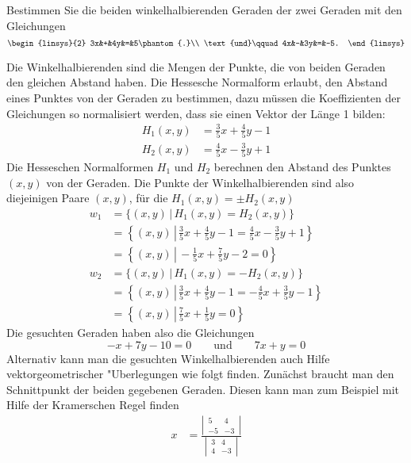 Bestimmen Sie die beiden winkelhalbierenden Geraden der zwei Geraden
mit den Gleichungen
\[
\begin{linsys}{2}
3x&+&4y&=&5\phantom{.}\\
\text{und}\qquad 4x&-&3y&=&-5.
\end{linsys}
\]


\begin{loesung}
Die Winkelhalbierenden sind die Mengen der Punkte, die von beiden
Geraden den gleichen Abstand haben. Die Hessesche Normalform erlaubt,
den Abstand eines Punktes von der Geraden zu bestimmen, dazu müssen
die Koeffizienten der Gleichungen so normalisiert werden, dass sie
einen Vektor der Länge 1 bilden:
\begin{align*}
H_1(x,y)&=\frac35x+\frac45y-1\\
H_2(x,y)&=\frac45x-\frac35y+1
\end{align*}
Die Hesseschen Normalformen $H_1$ und $H_2$ berechnen den Abstand
des Punktes $(x,y)$ von der Geraden. Die Punkte der Winkelhalbierenden
sind also diejeinigen Paare $(x,y)$, für die $H_1(x,y)=\pm H_2(x,y)$
\begin{align*}
w_1
&=
\{(x,y)\,|\, H_1(x,y)=H_2(x,y)\}
\\
&=
\left\{(x,y)\,\left|\, 
\frac35x+\frac45y-1=\frac45x-\frac35y+1\right.\right\}
\\
&=
\left\{(x,y)\,\left|\,
-\frac15x+\frac75y-2=0
\right.\right\}
\\
w_2&=\{(x,y)\,|\, H_1(x,y)=-H_2(x,y)\}
\\
&=
\left\{(x,y)\,\left|\, 
\frac35x+\frac45y-1=-\frac45x+\frac35y-1\right.\right\}
\\
&=
\left\{(x,y)\,\left|\,
\frac75x+\frac15y=0
\right.\right\}
\end{align*}
Die gesuchten Geraden haben also die Gleichungen
\[
-x+7y-10=0
\qquad
\text{und}
\qquad
7x+y=0
\]
Alternativ kann man die gesuchten Winkelhalbierenden auch Hilfe
vektorgeometrischer "Uberlegungen wie folgt finden.
Zunächst braucht man den Schnittpunkt der beiden gegebenen Geraden.
Diesen kann man zum Beispiel mit Hilfe der Kramerschen Regel
finden
\begin{align*}
x&=\frac{\left|\,\begin{matrix}5&4\\-5&-3\end{matrix}\,\right|}{\left|\,\begin{matrix}3&4\\4&-3\end{matrix}\,\right|}

\end{align*}
\end{loesung}
